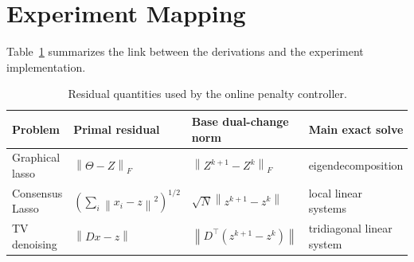 \documentclass[11pt]{article}
\newcommand{\norm}[1]{\left\lVert #1 \right\rVert}
\begin{document}
\section{Experiment Mapping}

Table~\ref{tab:mapping} summarizes the link between the derivations and the
experiment implementation.
\begin{table}[h]
\centering
\begin{tabular}{llll}
\toprule
Problem & Primal residual & Base dual-change norm & Main exact solve \\
\midrule
Graphical lasso
& $\norm{\Theta-Z}_F$
& $\norm{Z^{k+1}-Z^k}_F$
& eigendecomposition \\
Consensus Lasso
& $\left(\sum_i\norm{x_i-z}^2\right)^{1/2}$
& $\sqrt{N}\norm{z^{k+1}-z^k}$
& local linear systems \\
TV denoising
& $\norm{Dx-z}$
& $\norm{D^\top(z^{k+1}-z^k)}$
& tridiagonal linear system \\
\bottomrule
\end{tabular}
\caption{Residual quantities used by the online penalty controller.}
\label{tab:mapping}
\end{table}
\end{document}
